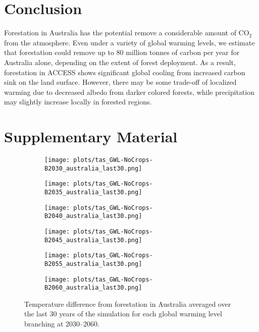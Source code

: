 \documentclass[]{article}
\begin{document}
\section{Conclusion}

Forestation in Australia has the potential remove a considerable amount of CO$_2$ from the atmosphere.
Even under a variety of global warming levels, we estimate that forestation could remove up to 80 million tonnes of carbon per year for Australia alone, depending on the extent of forest deployment.
As a result, forestation in ACCESS shows significant global cooling from increased carbon sink on the land surface.
However, there may be some trade-off of localized warming due to decreased albedo from darker colored forests, while precipitation may slightly increase locally in forested regions.

\printbibliography

\section{Supplementary Material}
\setcounter{figure}{0}

\begin{figure}[H]
    \centering
    \begin{subfigure}[b]{0.4\linewidth}
        \texttt{[image: plots/tas\_GWL-NoCrops-B2030\_australia\_last30.png]}
    \end{subfigure}
    \begin{subfigure}[b]{0.4\linewidth}
        \texttt{[image: plots/tas\_GWL-NoCrops-B2035\_australia\_last30.png]}
    \end{subfigure}
    \begin{subfigure}[b]{0.4\linewidth}
        \texttt{[image: plots/tas\_GWL-NoCrops-B2040\_australia\_last30.png]}
    \end{subfigure}
    \begin{subfigure}[b]{0.4\linewidth}
        \texttt{[image: plots/tas\_GWL-NoCrops-B2045\_australia\_last30.png]}
    \end{subfigure}
    \begin{subfigure}[b]{0.4\linewidth}
        \texttt{[image: plots/tas\_GWL-NoCrops-B2055\_australia\_last30.png]}
    \end{subfigure}
    \begin{subfigure}[b]{0.4\linewidth}
        \texttt{[image: plots/tas\_GWL-NoCrops-B2060\_australia\_last30.png]}
    \end{subfigure}
    \caption{Temperature difference from forestation in Australia averaged over the last 30 years of the simulation for each global warming level branching at 2030--2060.
    }
    \label{fig:tas_australia}
\end{figure}
\end{document}
